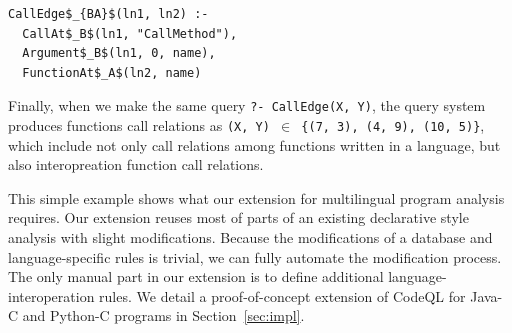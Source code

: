 
\begin{lstlisting}
CallEdge$_{BA}$(ln1, ln2) :-
  CallAt$_B$(ln1, "CallMethod"),
  Argument$_B$(ln1, 0, name),
  FunctionAt$_A$(ln2, name)
\end{lstlisting}

%

Finally, when we make the same query {\tt ?- CallEdge(X, Y)}, the query system
produces functions call relations as {\tt (X, Y) $\in$ \{(7, 3), (4, 9), (10,
5)\}}, which include not only call relations among functions written in a
language, but also interopreation function call relations. 

This simple example shows what our extension for multilingual program analysis
requires. Our extension reuses most of parts of an existing declarative style
analysis with slight modifications. Because the modifications of a database and
language-specific rules is trivial, we can fully automate the modification
process.  The only manual part in our extension is to define additional
language-interoperation rules. We detail a proof-of-concept extension of CodeQL
for Java-C and Python-C programs in Section~\ref{sec:impl}.


